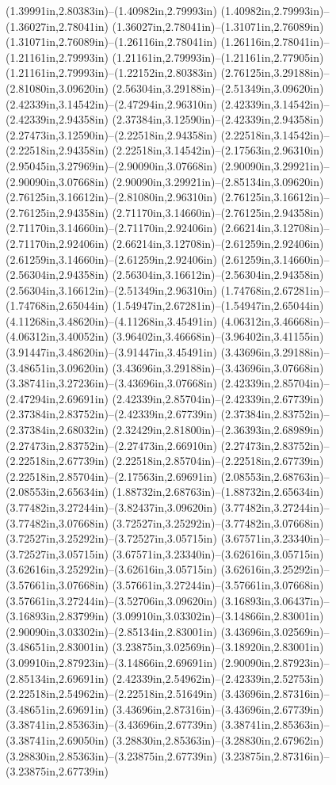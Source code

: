 (1.39991in,2.80383in)--(1.40982in,2.79993in) (1.40982in,2.79993in)--(1.36027in,2.78041in) (1.36027in,2.78041in)--(1.31071in,2.76089in) (1.31071in,2.76089in)--(1.26116in,2.78041in) (1.26116in,2.78041in)--(1.21161in,2.79993in) (1.21161in,2.79993in)--(1.21161in,2.77905in) (1.21161in,2.79993in)--(1.22152in,2.80383in) (2.76125in,3.29188in)--(2.81080in,3.09620in) (2.56304in,3.29188in)--(2.51349in,3.09620in) (2.42339in,3.14542in)--(2.47294in,2.96310in) (2.42339in,3.14542in)--(2.42339in,2.94358in) (2.37384in,3.12590in)--(2.42339in,2.94358in) (2.27473in,3.12590in)--(2.22518in,2.94358in) (2.22518in,3.14542in)--(2.22518in,2.94358in) (2.22518in,3.14542in)--(2.17563in,2.96310in) (2.95045in,3.27969in)--(2.90090in,3.07668in) (2.90090in,3.29921in)--(2.90090in,3.07668in) (2.90090in,3.29921in)--(2.85134in,3.09620in) (2.76125in,3.16612in)--(2.81080in,2.96310in) (2.76125in,3.16612in)--(2.76125in,2.94358in) (2.71170in,3.14660in)--(2.76125in,2.94358in) (2.71170in,3.14660in)--(2.71170in,2.92406in) (2.66214in,3.12708in)--(2.71170in,2.92406in) (2.66214in,3.12708in)--(2.61259in,2.92406in) (2.61259in,3.14660in)--(2.61259in,2.92406in) (2.61259in,3.14660in)--(2.56304in,2.94358in) (2.56304in,3.16612in)--(2.56304in,2.94358in) (2.56304in,3.16612in)--(2.51349in,2.96310in) (1.74768in,2.67281in)--(1.74768in,2.65044in) (1.54947in,2.67281in)--(1.54947in,2.65044in) (4.11268in,3.48620in)--(4.11268in,3.45491in) (4.06312in,3.46668in)--(4.06312in,3.40052in) (3.96402in,3.46668in)--(3.96402in,3.41155in) (3.91447in,3.48620in)--(3.91447in,3.45491in) (3.43696in,3.29188in)--(3.48651in,3.09620in) (3.43696in,3.29188in)--(3.43696in,3.07668in) (3.38741in,3.27236in)--(3.43696in,3.07668in) (2.42339in,2.85704in)--(2.47294in,2.69691in) (2.42339in,2.85704in)--(2.42339in,2.67739in) (2.37384in,2.83752in)--(2.42339in,2.67739in) (2.37384in,2.83752in)--(2.37384in,2.68032in) (2.32429in,2.81800in)--(2.36393in,2.68989in) (2.27473in,2.83752in)--(2.27473in,2.66910in) (2.27473in,2.83752in)--(2.22518in,2.67739in) (2.22518in,2.85704in)--(2.22518in,2.67739in) (2.22518in,2.85704in)--(2.17563in,2.69691in) (2.08553in,2.68763in)--(2.08553in,2.65634in) (1.88732in,2.68763in)--(1.88732in,2.65634in) (3.77482in,3.27244in)--(3.82437in,3.09620in) (3.77482in,3.27244in)--(3.77482in,3.07668in) (3.72527in,3.25292in)--(3.77482in,3.07668in) (3.72527in,3.25292in)--(3.72527in,3.05715in) (3.67571in,3.23340in)--(3.72527in,3.05715in) (3.67571in,3.23340in)--(3.62616in,3.05715in) (3.62616in,3.25292in)--(3.62616in,3.05715in) (3.62616in,3.25292in)--(3.57661in,3.07668in) (3.57661in,3.27244in)--(3.57661in,3.07668in) (3.57661in,3.27244in)--(3.52706in,3.09620in) (3.16893in,3.06437in)--(3.16893in,2.83799in) (3.09910in,3.03302in)--(3.14866in,2.83001in) (2.90090in,3.03302in)--(2.85134in,2.83001in) (3.43696in,3.02569in)--(3.48651in,2.83001in) (3.23875in,3.02569in)--(3.18920in,2.83001in) (3.09910in,2.87923in)--(3.14866in,2.69691in) (2.90090in,2.87923in)--(2.85134in,2.69691in) (2.42339in,2.54962in)--(2.42339in,2.52753in) (2.22518in,2.54962in)--(2.22518in,2.51649in) (3.43696in,2.87316in)--(3.48651in,2.69691in) (3.43696in,2.87316in)--(3.43696in,2.67739in) (3.38741in,2.85363in)--(3.43696in,2.67739in) (3.38741in,2.85363in)--(3.38741in,2.69050in) (3.28830in,2.85363in)--(3.28830in,2.67962in) (3.28830in,2.85363in)--(3.23875in,2.67739in) (3.23875in,2.87316in)--(3.23875in,2.67739in) 